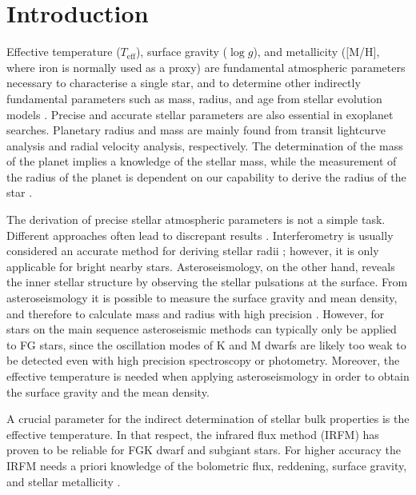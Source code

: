 \documentclass{aa}
\begin{document}
\section{Introduction}
\label{sec:introduction}

Effective temperature ($T_\mathrm{eff}$), surface gravity ($\log g$),
and metallicity ([M/H], where iron is normally used as a proxy)
are fundamental atmospheric parameters necessary to characterise a single
star, and to determine other indirectly fundamental parameters
such as mass, radius, and age from stellar evolution models
\citep[see e.g.][]{Girardi2000,Dotter2008,Baraffe2015}.
Precise and accurate stellar parameters are also essential in
exoplanet searches. Planetary radius and mass are mainly found from
transit lightcurve analysis and radial velocity analysis, respectively. The
determination of the mass of the planet implies a knowledge of the
stellar mass, while the measurement of the radius of the planet
is dependent on our capability to derive the radius of the star
\citep[see e.g.][]{Torres2008,Ammler2009,Torres2012}.

The derivation of precise stellar atmospheric parameters is not a simple task.
Different approaches often lead to discrepant results
\citep[see e.g.][]{Torres2010,Lebzelter2012b,Santos13}. Interferometry is
usually considered  an accurate method for deriving stellar radii
\citep[see e.g.][]{Boyajian2012}; however, it is only applicable for bright
nearby stars. Asteroseismology, on the other hand, reveals the inner stellar
structure by observing the stellar pulsations at the surface. From
asteroseismology it is possible to measure the surface gravity and mean density,
and therefore to calculate mass and radius with high precision \citep[see
e.g.][]{Kjeldsen1995}. However, for stars on the main sequence asteroseismic
methods can typically only be applied to FG stars, since the oscillation modes
of K and M dwarfs are likely too weak to be detected even with high precision
spectroscopy or photometry. Moreover, the effective temperature is needed when
applying asteroseismology in order to obtain the surface gravity and the mean
density.

A crucial parameter for the indirect determination of stellar bulk properties is
the effective temperature. In that respect, the infrared flux method (IRFM) has
proven to be reliable for FGK dwarf and subgiant stars. For higher accuracy the
IRFM needs a priori knowledge of the bolometric flux, reddening, surface
gravity, and stellar metallicity
\citep{Blackwell1977,Ramirez2005b,Casagrande2010}.
\end{document}
